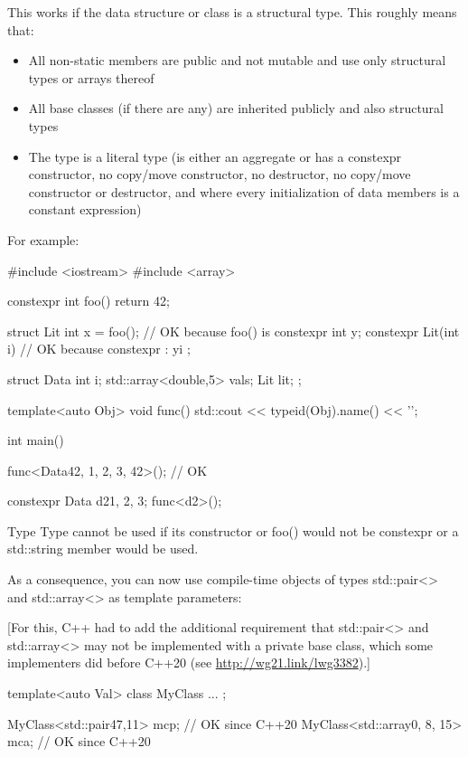 This works if the data structure or class is a structural type. This roughly means that:

\begin{itemize}
\item 
All non-static members are public and not mutable and use only structural types or arrays thereof

\item 
All base classes (if there are any) are inherited publicly and also structural types

\item 
The type is a literal type (is either an aggregate or has a constexpr constructor, no copy/move constructor, no destructor, no copy/move constructor or destructor, and where every initialization of data members is a constant expression)
\end{itemize}

For example:


\begin{cpp}
#include <iostream>
#include <array>

constexpr int foo()
{
	return 42;
}

struct Lit {
	int x = foo(); // OK because foo() is constexpr
	int y;
	constexpr Lit(int i) // OK because constexpr
		: y{i} {
	}
};

struct Data {
	int i;
	std::array<double,5> vals;
	Lit lit;
};

template<auto Obj>
void func()
{
	std::cout << typeid(Obj).name() << '\n';
}

int main()
{
	func<Data{42, {1, 2, 3}, 42}>(); // OK
	
	constexpr Data d2{1, {2}, 3};
	func<d2>();
}
\end{cpp}

Type Type cannot be used if its constructor or foo() would not be constexpr or a std::string member would be used.


As a consequence, you can now use compile-time objects of types std::pair<> and std::array<> as template parameters:

[For this, C++ had to add the additional requirement that std::pair<> and std::array<> may not be implemented with a private base class, which some implementers did before C++20 (see \url{http://wg21.link/lwg3382}).]

\begin{cpp}
template<auto Val>
class MyClass {
	...
};

MyClass<std::pair{47,11}> mcp; // OK since C++20
MyClass<std::array{0, 8, 15}> mca; // OK since C++20
\end{cpp}

